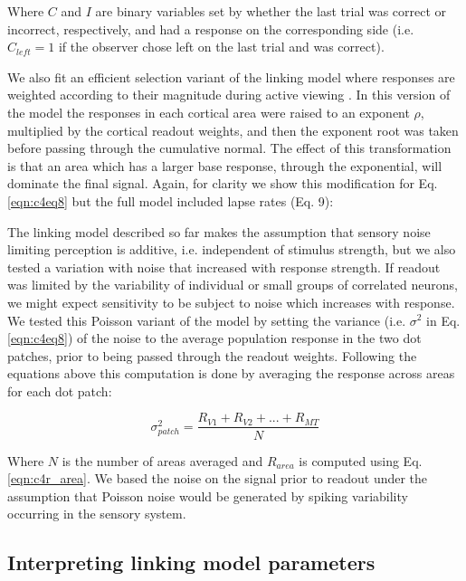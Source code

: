 \documentclass{report}
\begin{document}
Where $C$ and $I$ are binary variables set by whether the last trial was correct or incorrect, respectively, and had a response on the corresponding side (i.e. $C_{left}=1$ if the observer chose left on the last trial and was correct).  

We also fit an efficient selection variant of the linking model where responses are weighted according to their magnitude during active viewing \citep{Hara2014-mv,Pestilli2011-gi}. In this version of the model the responses in each cortical area were raised to an exponent $\rho$, multiplied by the cortical readout weights, and then the exponent root was taken before passing through the cumulative normal. The effect of this transformation is that an area which has a larger base response, through the exponential, will dominate the final signal. Again, for clarity we show this modification for Eq. \ref{eqn:c4eq8} but the full model included lapse rates (Eq. 9):


The linking model described so far makes the assumption that sensory noise limiting perception is additive, i.e. independent of stimulus strength, but we also tested a variation with noise that increased with response strength. If readout was limited by the variability of individual or small groups of correlated neurons, we might expect sensitivity to be subject to noise which increases with response. We tested this Poisson variant of the model by setting the variance (i.e. $\sigma^2$ in Eq. \ref{eqn:c4eq8}) of the noise to the average population response in the two dot patches, prior to being passed through the readout weights. Following the equations above this computation is done by averaging the response across areas for each dot patch:

\begin{equation}
    \sigma_{patch}^2=\frac{R_{V1}+R_{V2}+...+R_{MT}}{N}
\end{equation}

Where $N$ is the number of areas averaged and $R_{area}$ is computed using Eq. \ref{eqn:c4r_area}. We based the noise on the signal prior to readout under the assumption that Poisson noise would be generated by spiking variability occurring in the sensory system.

\subsection{Interpreting linking model parameters}
\end{document}
